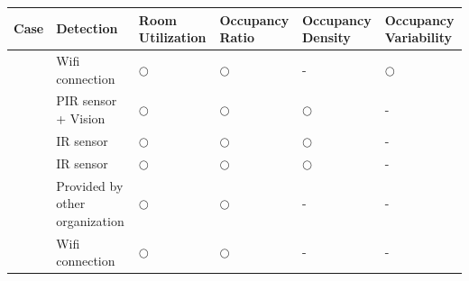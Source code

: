 \small
\setlength{\tabcolsep}{3pt} %
\renewcommand{\arraystretch}{1.2}
\begin{tabularx}{\textwidth}{
    p{1.5cm}   %
    p{3.5cm}   %
    >{\centering\arraybackslash}p{2.0cm} %
    >{\centering\arraybackslash}p{2.0cm} %
    >{\centering\arraybackslash}p{2.0cm} %
    >{\centering\arraybackslash}p{2.0cm} %
}
\toprule
\textbf{Case} & \textbf{Detection} &
\textbf{Room Utilization} &
\textbf{Occupancy Ratio} &
\textbf{Occupancy Density} &
\textbf{Occupancy Variability} \\
\midrule
\cite{stojanovic_impact_2024} &
Wifi connection &
\(\bigcirc\) & \(\bigcirc\) & - & \(\bigcirc\) \\
\addlinespace
\cite{motuziene_office_2022} &
PIR sensor + Vision &
\(\bigcirc\) & \(\bigcirc\) & \(\bigcirc\) & - \\
\addlinespace
\cite{pitchforth_work_2020} &
IR sensor &
\(\bigcirc\) & \(\bigcirc\) & \(\bigcirc\) & - \\
\addlinespace
\cite{pan_environmental_2025} &
IR sensor &
\(\bigcirc\) & \(\bigcirc\) & \(\bigcirc\) & - \\
\addlinespace
\cite{gocer_overlaps_2022} &
Provided by other organization &
\(\bigcirc\) & \(\bigcirc\) & - & - \\
\addlinespace
\cite{brambilla_potential_2021} &
Wifi connection &
\(\bigcirc\) & \(\bigcirc\) & - & - \\
\bottomrule
\end{tabularx}
